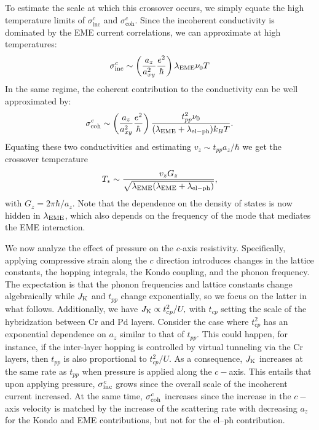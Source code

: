 \documentclass[aps,prl,twocolumn,superscriptaddress,amsmath,nofootinbib,10pt,floatfix]{revtex4-2}
\def \beq {\begin{eqnarray}}
\def \eeq {\end{eqnarray}}
\begin{document}
\begin{widetext}
To estimate the scale at which this crossover occurs, we simply equate the high temperature limits of $\sigma^c_{\text{inc}}$ and $\sigma^c_{\text{coh}}$. Since the incoherent conductivity is dominated by the EME current correlations, we can approximate at high temperatures:
\beq
\sigma^c_{\text{inc}}\sim \left(\frac{a_{z}}{a_{xy}^{2}}\frac{e^{2}}{\hbar}\right)\lambda_{\rm{EME}}\nu_{0}T
\label{eqn:hight_inch}
\eeq
In the same regime, the coherent contribution to the conductivity can be well approximated by:
\beq
\sigma^c_{\text{coh}} \sim  \left(\frac{a_{z}}{a_{xy}^{2}}\frac{e^{2}}{\hbar}\right)\frac{t_{pp}^{2}\nu_{0}}{(\lambda_{\rm{EME}}+\lambda_{\rm{el-ph}}) k_{B}T}.
\label{eqn:hight_coh}
\eeq
Equating these two conductivities and estimating $v_z\sim t_{pp} a_z /\hbar$ we get the crossover temperature 
\begin{equation}
    T_*\sim\frac{v_z G_z}{\sqrt{\lambda_{\rm{EME}}(\lambda_{\rm{EME}}+\lambda_{\rm{el-ph}})} },
    \label{eqn:tstarscale}
\end{equation}
with $G_z=2\pi \hbar /a_z$. Note that the dependence on the density of states is now hidden in $\lambda_{\rm{EME}}$, which also depends on the frequency of the mode that mediates the EME interaction.

We now analyze the effect of pressure on the $c$-axis resistivity.
 Specifically, applying compressive strain along the $c$ direction introduces changes in the lattice constants, the hopping integrals, the Kondo coupling, and the phonon frequency. The expectation is that the phonon frequencies and lattice constants change algebraically while $J_{\rm{K}}$ and $t_{pp}$ change exponentially, so we focus on the latter in what follows. Additionally, we have $J_{\rm{K}} \propto t_{cp}^2/U,$ with $t_{cp}$ setting the scale of the hybridzation between Cr and Pd layers.  Consider the case where $t_{cp}^2$ has an exponential dependence on $a_z$ similar to that of $t_{pp}$. This could happen, for instance, if the inter-layer hopping is controlled by virtual tunneling via the Cr layers, then $t_{pp}$ is also proportional to $t_{cp}^2/U$. As a consequence, $J_{\rm{K}}$ increases at the same rate as $t_{pp}$ when pressure is applied along the $c-$axis. This entails that upon applying pressure, $\sigma^{c}_{\rm inc}$ grows since the overall scale of the incoherent current increased. At the same time, $\sigma^{c}_{\rm{coh}}$  increases since the increase in the $c-$axis velocity is matched by the increase of the scattering rate with decreasing $a_z$ for the Kondo and EME contributions, but not for the el--ph contribution. 


\end{widetext}
\end{document}
